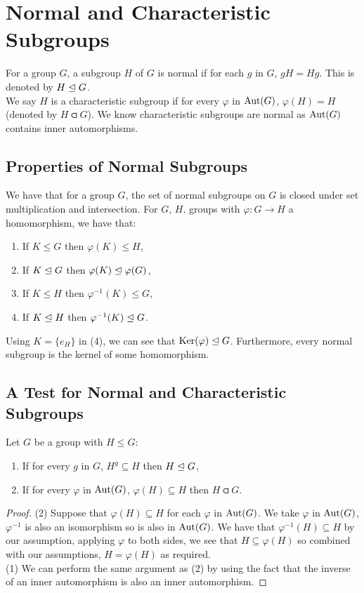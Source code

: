 \section{Normal and Characteristic Subgroups}

For a group $G$, a subgroup $H$ of $G$ is normal if for each $g$ in $G$,
$gH = Hg$. This is denoted by $H \trianglelefteq G$.
\\[\baselineskip]
We say $H$ is a characteristic subgroup if for every $\varphi$ in $\operatorname{Aut}(G)$,
$\varphi(H) = H$ (denoted by $H \csub G$). We know characteristic subgroups
are normal as $\operatorname{Aut}(G)$ contains inner automorphisms.

\subsection{Properties of Normal Subgroups} \label{normal_prop}

We have that for a group $G$, the set of normal subgroups on $G$
is closed under set multiplication and intersection. For $G$, $H$.
groups with $\varphi : G \to H$ a homomorphism, we have that: \begin{enumerate}
    \item If $K \leq G$ then $\varphi(K) \leq H$,
    \item If $K \trianglelefteq G$ then $\varphi(K) \trianglelefteq \varphi(G)$,
    \item If $K \leq H$ then $\varphi^{-1}(K) \leq G$,
    \item If $K \trianglelefteq H$ then $\varphi^{-1}(K) \trianglelefteq G$.
\end{enumerate} Using $K = \{e_H\}$ in (4), we can see that $\operatorname{Ker}(\varphi) \trianglelefteq G$.
Furthermore, every normal subgroup is the kernel of some homomorphism.


\subsection{A Test for Normal and Characteristic Subgroups}

Let $G$ be a group with $H \leq G$: \begin{enumerate}
    \item If for every $g$ in $G$, $H^g \subseteq H$ then $H \trianglelefteq G$,
    \item If for every $\varphi$ in $\operatorname{Aut}(G)$, $\varphi(H) \subseteq H$ 
        then $H \csub G$.
\end{enumerate}

\begin{proof}
    (2) Suppose that $\varphi(H) \subseteq H$ for each $\varphi$ in $\operatorname{Aut}(G)$.
    We take $\varphi$ in $\operatorname{Aut}(G)$, $\varphi^{-1}$ is also an isomorphism
    so is also in $\operatorname{Aut}(G)$. We have that $\varphi^{-1}(H) \subseteq H$
    by our assumption, applying $\varphi$ to both sides, we see that
    $H \subseteq \varphi(H)$ so combined with our assumptions, 
    $H = \varphi(H)$ as required.
    \\[\baselineskip]
    (1) We can perform the same argument as (2) by using the fact that the
    inverse of an inner automorphism is also an inner automorphism.
\end{proof}

